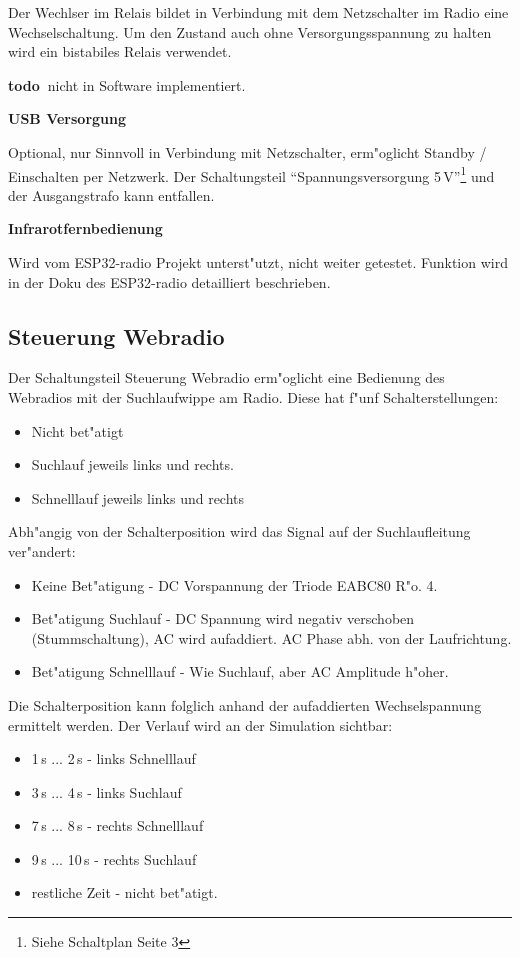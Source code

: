 \documentclass[ngerman,11pt,parskip=half] {scrartcl}
\newcommand {\todo} {\textbf{\color{red} todo\ }}
\begin{document}
Der Wechlser im Relais bildet in Verbindung mit dem Netzschalter im Radio eine Wechselschaltung. Um den Zustand auch ohne Versorgungsspannung zu halten wird ein bistabiles Relais verwendet.

\todo nicht in Software implementiert.

\textbf{USB Versorgung}

Optional, nur Sinnvoll in Verbindung mit Netzschalter, erm"oglicht Standby / Einschalten per Netzwerk. Der Schaltungsteil "`Spannungsversorgung 5\,V"'\footnote{Siehe Schaltplan Seite 3} und der Ausgangstrafo kann entfallen.

\textbf{Infrarotfernbedienung}

Wird vom ESP32-radio Projekt unterst"utzt, nicht weiter getestet. Funktion wird in der Doku des ESP32-radio detailliert beschrieben.

\subsection{Steuerung Webradio} \label{sec:schaltung:steuern-web}

Der Schaltungsteil Steuerung Webradio erm"oglicht eine Bedienung des Webradios mit der Suchlaufwippe am Radio. Diese hat f"unf Schalterstellungen:
\begin{itemize}
\item Nicht bet"atigt
\item Suchlauf jeweils links und rechts.
\item Schnelllauf jeweils links und rechts
\end{itemize}
Abh"angig von der Schalterposition wird das Signal auf der Suchlaufleitung ver"andert:
\begin{itemize}
\item Keine Bet"atigung - DC Vorspannung der Triode EABC80 R"o. 4.
\item Bet"atigung Suchlauf - DC Spannung wird negativ verschoben (Stummschaltung), AC wird aufaddiert. AC Phase abh. von der Laufrichtung.
\item Bet"atigung Schnelllauf - Wie Suchlauf, aber AC Amplitude h"oher.
\end{itemize}

Die Schalterposition kann folglich anhand der aufaddierten Wechselspannung ermittelt werden. Der Verlauf wird an der Simulation sichtbar:

\begin{itemize}
\item 1\,s ... 2\,s - links Schnelllauf
\item 3\,s ... 4\,s - links Suchlauf
\item 7\,s ... 8\,s - rechts Schnelllauf
\item 9\,s ... 10\,s - rechts Suchlauf
\item restliche Zeit - nicht bet"atigt.
\end{itemize}
\end{document}
